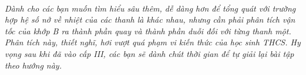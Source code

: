 \ \ 

\textit{Dành cho các bạn muốn tìm hiểu sâu thêm, dễ dàng hơn để tổng quát với trường hợp hệ số nở về nhiệt của các thanh là khác nhau, nhưng cần phải phân tích vận tốc của khớp B ra thành phần quay và thành phần duỗi đối với từng thanh một. Phân tích này, thiết nghĩ, hơi vượt quá phạm vi kiến thức của học sinh THCS. Hy vọng sau khi đã vào cấp III, các bạn sẽ dành chút thời gian để tự giải lại bài tập theo hướng này.}